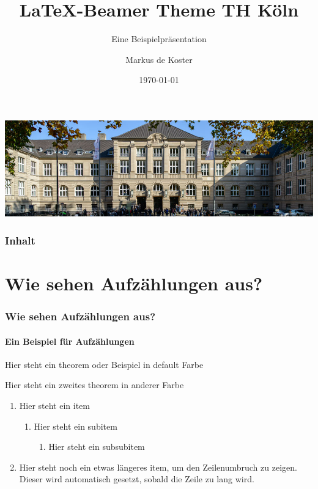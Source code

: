 \documentclass{beamer}
\title{\LaTeX -Beamer Theme TH Köln}
\subtitle[Beispielpräsi]{Eine Beispielpräsentation}
\institute[TH Köln]{Technische Hochschule Köln}
\date[\ddmmyyyydate\today]{\today} %
\author[de Koster]{Markus de Koster}
\begin{document}
\begin{frame}
    \vspace{2em} %
    \includegraphics[width=\textwidth]{figures/thk.jpg}
    \titlepage
\end{frame}

\begin{frame}
    \frametitle{Inhalt}
    \tableofcontents
\end{frame}

\section{Wie sehen Aufzählungen aus?}\label{sec:enumerations}
\begin{frame} 
    \frametitle{Wie sehen Aufzählungen aus?} 
    \framesubtitle{Ein Beispiel für Aufzählungen} 
    \begin{theorem}
        Hier steht ein theorem oder Beispiel in default Farbe
    \end{theorem}

    \begin{theorem}
        Hier steht ein zweites theorem in anderer Farbe
    \end{theorem}
    \begin{enumerate} 
        \item Hier steht ein item 
        \begin{enumerate} 
            \item Hier steht ein subitem
            \begin{enumerate} 
                \item Hier steht ein subsubitem
            \end{enumerate}
        \end{enumerate}
        \item Hier steht noch ein etwas längeres item, um den Zeilenumbruch zu zeigen. 
        Dieser wird automatisch gesetzt, sobald die Zeile zu lang wird.
    \end{enumerate}
\end{frame}
\end{document}
